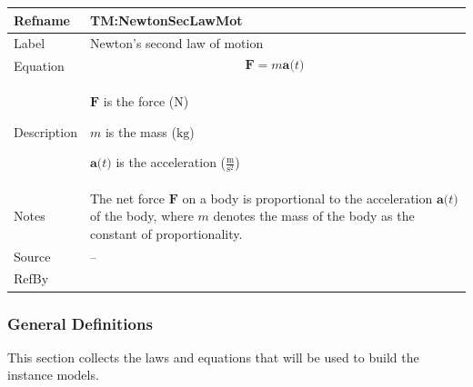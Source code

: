 \documentclass[12pt]{article}
\begin{document}
\vspace{\baselineskip}
\noindent
\begin{minipage}{\textwidth}
\begin{tabular}{>{\raggedright}p{}>{\raggedright\arraybackslash}p{}}
\toprule \textbf{Refname} & \textbf{TM:NewtonSecLawMot}
\label{TM:NewtonSecLawMot}
\\ \midrule
Label & Newton's second law of motion
        
\\ \midrule
Equation & \begin{displaymath}
           \symbf{F}=m \symbf{a}\text{(}t\text{)}
           \end{displaymath}
\\ \midrule
Description & \begin{symbDescription}
              \item{$\symbf{F}$ is the force (${\text{N}}$)}
              \item{$m$ is the mass (${\text{kg}}$)}
              \item{$\symbf{a}\text{(}t\text{)}$ is the acceleration ($\frac{\text{m}}{\text{s}^{2}}$)}
              \end{symbDescription}
\\ \midrule
Notes & The net force $\symbf{F}$ on a body is proportional to the acceleration $\symbf{a}\text{(}t\text{)}$ of the body, where $m$ denotes the mass of the body as the constant of proportionality.
        
\\ \midrule
Source & --
         
\\ \midrule
RefBy & 
\\ \bottomrule
\end{tabular}
\end{minipage}
\subsubsection{General Definitions}
\label{Sec:GDs}
This section collects the laws and equations that will be used to build the instance models.
\end{document}
